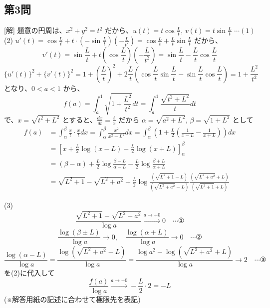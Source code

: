 \documentclass[../main.tex]{subfiles}
\begin{document}
\subsection*{第3問}
[解] 題意の円周は、$x^2+y^2=t^2$ だから、$u(t) = t \cos \frac{L}{t}$, $v(t) = t \sin \frac{L}{t}$ $\cdots (1)$
(2) $u'(t) = \cos \frac{L}{t} + t \cdot \left( -\sin \frac{L}{t} \right) \left( -\frac{L}{t^2} \right) = \cos \frac{L}{t} + \frac{L}{t} \sin \frac{L}{t}$ だから、
\[ v'(t) = \sin \frac{L}{t} + t \left( \cos \frac{L}{t} \right) \left( -\frac{L}{t^2} \right) = \sin \frac{L}{t} - \frac{L}{t} \cos \frac{L}{t} \]
\[ \{u'(t)\}^2 + \{v'(t)\}^2 = 1 + \left( \frac{L}{t} \right)^2 + 2 \frac{L}{t} \left( \cos \frac{L}{t} \sin \frac{L}{t} - \sin \frac{L}{t} \cos \frac{L}{t} \right) = 1 + \frac{L^2}{t^2} \]
となり、$0 < a < 1$ から、
\[ f(a) = \int_a^1 \sqrt{1 + \frac{L^2}{t^2}} dt = \int_a^1 \frac{\sqrt{t^2+L^2}}{t} dt \]
で、$x = \sqrt{t^2+L^2}$ とすると、$\frac{dx}{dt} = \frac{t}{x}$ だから $\alpha = \sqrt{a^2+L^2}$, $\beta = \sqrt{1+L^2}$ として
\begin{align*}
  f(a) &= \int_\alpha^\beta \frac{x}{t} \cdot \frac{x}{t} dx = \int_\alpha^\beta \frac{x^2}{x^2-L^2} dx = \int_\alpha^\beta \left( 1 + \frac{L}{2} \left( \frac{1}{x-L} - \frac{1}{x+L} \right) \right) dx \\
  &= \left[ x + \frac{L}{2} \log (x-L) - \frac{L}{2} \log (x+L) \right]_\alpha^\beta \\
  &= (\beta - \alpha) + \frac{L}{2} \log \frac{\beta-L}{\alpha-L} - \frac{L}{2} \log \frac{\beta+L}{\alpha+L} \\
  &= \sqrt{L^2+1} - \sqrt{L^2+a^2} + \frac{L}{2} \log \frac{(\sqrt{L^2+1}-L)}{(\sqrt{L^2+a^2}-L)} \frac{(\sqrt{L^2+a^2}+L)}{(\sqrt{L^2+1}+L)}
\end{align*}

(3)
\[ \frac{\sqrt{L^2+1} - \sqrt{L^2+a^2}}{\log a} \xrightarrow{a \to +0} 0 \quad \cdots \text{①} \]
\[ \frac{\log (\beta \pm L)}{\log a} \xrightarrow{} 0, \quad \frac{\log (\alpha + L)}{\log a} \xrightarrow{} 0 \quad \cdots \text{②} \]
\[ \frac{\log (\alpha - L)}{\log a} = \frac{\log (\sqrt{L^2+a^2} - L)}{\log a} = \frac{\log a^2 - \log (\sqrt{L^2+a^2} + L)}{\log a} \xrightarrow{} 2 \quad \cdots \text{③} \]
を(2)に代入して
\[ \frac{f(a)}{\log a} \xrightarrow{a \to +0} - \frac{L}{2} \cdot 2 = -L \]
(※解答用紙の記述に合わせて極限先を表記)

\begin{center}
\end{center}
\end{document}
